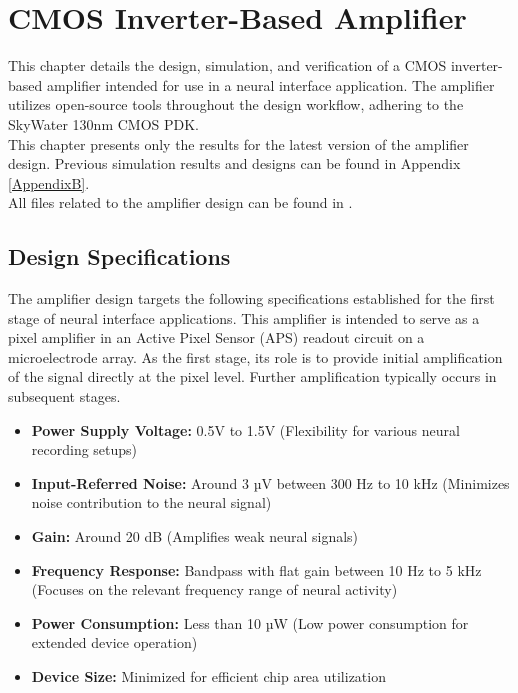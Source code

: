 \chapter{CMOS Inverter-Based Amplifier}
\label{chap:amplifier}

This chapter details the design, simulation, and verification of a CMOS inverter-based amplifier intended for use in a neural interface application. The amplifier utilizes open-source tools throughout the design workflow, adhering to the SkyWater 130nm CMOS PDK.
\\
This chapter presents only the results for the latest version of the amplifier design. Previous simulation results and designs can be found in Appendix \ref{AppendixB}.
\\
All files related to the amplifier design can be found in \textcite{miguelcorrea0107_2024}.

\section{Design Specifications}

The amplifier design targets the following specifications established for the first stage of neural interface applications. This amplifier is intended to serve as a pixel amplifier in an Active Pixel Sensor (APS) readout circuit on a microelectrode array. As the first stage, its role is to provide initial amplification of the signal directly at the pixel level. Further amplification typically occurs in subsequent stages.

\begin{itemize}
\item \textbf{Power Supply Voltage:} 0.5V to 1.5V (Flexibility for various neural recording setups)
\item \textbf{Input-Referred Noise:} Around 3 µV between 300 Hz to 10 kHz (Minimizes noise contribution to the neural signal)
\item \textbf{Gain:} Around 20 dB (Amplifies weak neural signals)
\item \textbf{Frequency Response:} Bandpass with flat gain between 10 Hz to 5 kHz (Focuses on the relevant frequency range of neural activity)
\item \textbf{Power Consumption:} Less than 10 µW (Low power consumption for extended device operation)
\item \textbf{Device Size:} Minimized for efficient chip area utilization
\end{itemize}

